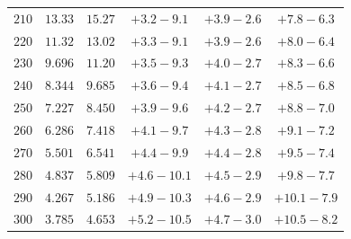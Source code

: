 \begin{table}[p]
\begin{center}
\begin{tabular}{cccccc}
$210 $&$  13.33  $&$  15.27 $&$  +3.2  -\!9.1 $&$ +3.9  -\!2.6 $&$  +7.8  -\!6.3 $\\
$220 $&$  11.32  $&$  13.02 $&$  +3.3  -\!9.1 $&$ +3.9  -\!2.6 $&$  +8.0  -\!6.4 $\\
$230 $&$   9.696 $&$  11.20 $&$  +3.5  -\!9.3 $&$ +4.0  -\!2.7 $&$  +8.3  -\!6.6 $\\
$240 $&$   8.344 $&$   9.685 $&$ +3.6  -\!9.4 $&$ +4.1  -\!2.7 $&$  +8.5  -\!6.8 $\\
$250 $&$   7.227 $&$   8.450 $&$ +3.9  -\!9.6 $&$ +4.2  -\!2.7 $&$  +8.8  -\!7.0 $\\
$260 $&$   6.286 $&$   7.418 $&$ +4.1  -\!9.7 $&$ +4.3  -\!2.8 $&$  +9.1  -\!7.2 $\\
$270 $&$   5.501 $&$   6.541 $&$ +4.4  -\!9.9 $&$ +4.4  -\!2.8 $&$  +9.5  -\!7.4 $\\
$280 $&$   4.837 $&$   5.809 $&$ +4.6  -\!10.1 $&$ +4.5  -\!2.9 $&$  +9.8  -\!7.7 $\\
$290 $&$   4.267 $&$   5.186 $&$ +4.9  -\!10.3 $&$ +4.6  -\!2.9 $&$ +10.1  -\!7.9 $\\
$300 $&$   3.785 $&$   4.653 $&$ +5.2  -\!10.5 $&$ +4.7  -\!3.0 $&$ +10.5  -\!8.2 $\\ \hline
    \end{tabular}
    \end{center}
\end{table}

